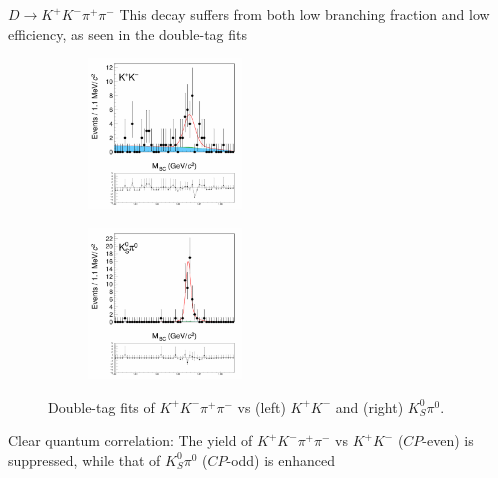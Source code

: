 \documentclass{beamer}
\begin{document}
\begin{frame}{$D\to K^+K^-\pi^+\pi^-$}
  \vspace{0.0cm}
  {\large This decay suffers from both low branching fraction and low efficiency, as seen in the double-tag fits}
  \begin{figure}
    \centering
    \begin{subfigure}{0.5\textwidth}
      \centering
      \includegraphics[height=4.0cm,trim={0 14.0cm 0 0},clip=true]{Figures/DoubleTagYield_DoubleTag_CP_KKpipi_vs_KK_SignalBin0.png}
    \end{subfigure}%
    \begin{subfigure}{0.5\textwidth}
      \centering
      \includegraphics[height=4.0cm,trim={0 14.0cm 0 0},clip=true]{Figures/DoubleTagYield_DoubleTag_CP_KKpipi_vs_KSpi0_SignalBin0.png}
    \end{subfigure}
    \caption*{Double-tag fits of $K^+K^-\pi^+\pi^-$ vs (left) $K^+K^-$ and (right) $K_S^0\pi^0$.}
  \end{figure}
  {\large Clear quantum correlation: The yield of $K^+K^-\pi^+\pi^-$ vs $K^+K^-$ ($C\!P$-even) is suppressed, while that of $K_S^0\pi^0$ ($C\!P$-odd) is enhanced}
\end{frame}
\end{document}
